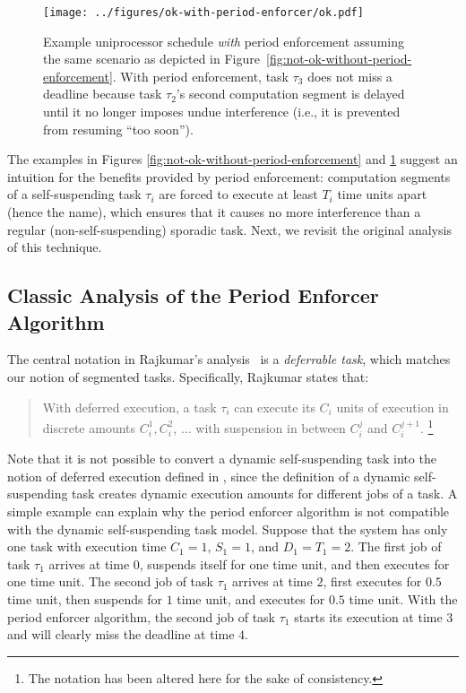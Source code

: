 \begin{figure}[t]
  \centering
  \texttt{[image: ../figures/ok-with-period-enforcer/ok.pdf]}
  \caption{Example uniprocessor schedule \emph{with} period enforcement assuming the same scenario as depicted in Figure~\ref{fig:not-ok-without-period-enforcement}. With period enforcement, task $\tau_3$ does not miss a deadline because task $\tau_2$'s second computation segment is delayed until it no longer imposes undue interference (i.e., it is prevented from resuming ``too soon'').}
  \label{fig:ok-with-period-enforcement}
\end{figure}

The examples in Figures \ref{fig:not-ok-without-period-enforcement} and \ref{fig:ok-with-period-enforcement} suggest an intuition for the benefits provided by period enforcement: computation segments of a self-suspending task $\tau_i$ are forced to execute at least $T_i$ time units apart (hence the name), which ensures that it causes no more interference than a regular (non-self-suspending) sporadic task. Next, we revisit the original analysis of this technique.


\subsection{Classic Analysis of the Period Enforcer Algorithm}
\label{sec:classic-analysis}

The central notation in Rajkumar's analysis~\cite{Raj:suspension1991} is a \emph{deferrable task}, which matches our notion of segmented tasks.  Specifically, Rajkumar states that:
\begin{quote}
With deferred execution, a task $\tau_i$ can execute its $C_i$ units of execution in discrete amounts $C_i^1, C_i^2$, $\ldots$ with suspension in between $C_i^j$ and $C_i^{j+1}$. \cite[Section 3]{Raj:suspension1991}\footnote{The notation has been altered here for the sake of consistency. } 
\end{quote}

Note that it is not possible to convert a dynamic self-suspending task into the notion of deferred execution defined in \cite[Section 3]{Raj:suspension1991}, since the definition of a dynamic self-suspending task creates dynamic execution amounts for different jobs of a task. A simple example can explain why the period enforcer algorithm is not compatible with the dynamic self-suspending task model. Suppose that the system has only one task with execution time $C_1=1$, $S_1=1$, and $D_1=T_1=2$. The first job of task $\tau_1$ arrives at time $0$, suspends itself for one time unit, and then executes for one time unit. The second job of task $\tau_1$ arrives at time $2$, first executes for $0.5$ time unit, then suspends for $1$ time unit, and executes for $0.5$ time unit. With the period enforcer algorithm, the second job of task $\tau_1$ starts its execution at time $3$ and will clearly miss the deadline at time $4$.


